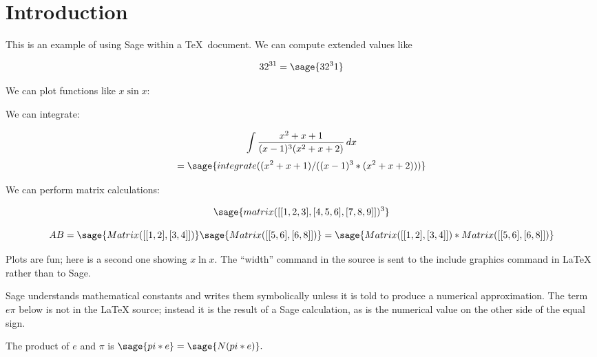 \documentclass[11pt, oneside]{amsart}
\begin{document}
\section{Introduction}

This is an example of using Sage within a \TeX\ document. We can compute extended values like 

	$$32^{31} = \sage{32^31}$$
	

We can plot functions like $x \sin x$:

 
 We can integrate:
 
 $$\int {{x^2 + x + 1} \over {(x - 1)^3 (x^2 + x + 2)}}\,dx$$
 $$=  \sage{integrate( (x^2 + x + 1) / ((x - 1)^3 * (x^2 + x + 2)) )}$$
 
 We can perform matrix calculations:
 
$$\sage{matrix([[1, 2, 3], [4, 5, 6], [7, 8, 9]])^3}$$

$$AB=  \sage{Matrix([[1, 2], [3, 4]])} \sage{Matrix([[5, 6], [6, 8]])} = \sage{Matrix([[1, 2], [3, 4]]) * Matrix([[5, 6], [6, 8]])}$$

Plots are fun; here is a second one showing $x \ln x$. The ``width'' command in the source is sent to the include graphics command in LaTeX rather than to Sage.


Sage understands mathematical constants and writes them symbolically unless it is told to produce a numerical approximation. The term $e \pi$ below is not in the LaTeX source; instead it is the result of a Sage calculation, as is the numerical value on the other side of the equal sign.

The product of $e$ and $\pi$ is $\sage{pi * e} = \sage{N(pi * e)}.$
\end{document}

